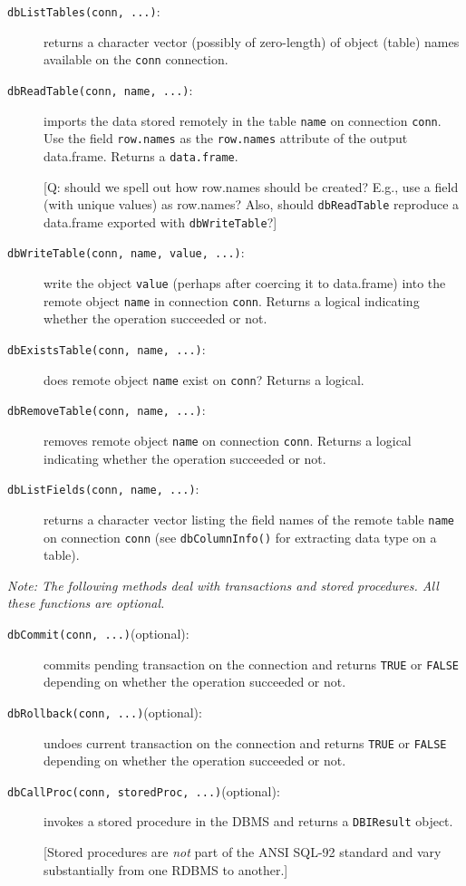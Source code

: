 \documentclass{article}
\newcommand{\sobj}[1]{\mbox{\tt #1}}    %
\newcommand{\sexp}[1]{\mbox{\tt #1}}    %
\newcommand{\sclass}[1]{\mbox{\tt #1}}  %
\newcommand{\smethod}[1]{\mbox{\tt #1}} %
\begin{document}
\begin{description}
\item[\smethod{dbListTables(conn, ...)}:]
  returns a character vector (possibly of zero-length) of object (table) 
  names available on the \sobj{conn} connection.

\item[\smethod{dbReadTable(conn, name, ...)}:]
  imports the data stored remotely in the table \sobj{name}
  on connection \sobj{conn}. Use the field \sobj{row.names} 
  as the \sexp{row.names} attribute of the output data.frame.
  Returns a \sclass{data.frame}.

  [Q: should we spell out how row.names should be created? E.g.,
  use a field (with unique values) as row.names?  Also, should
  \smethod{dbReadTable} reproduce a data.frame exported with
  \smethod{dbWriteTable}?]

\item[\smethod{dbWriteTable(conn, name, value, ...)}:]
  write the object \sobj{value} (perhaps after coercing it to 
  data.frame) into the remote object \sobj{name} in connection
  \sobj{conn}.  Returns a logical indicating whether the operation
  succeeded or not.

\item[\smethod{dbExistsTable(conn, name, ...)}:]
  does remote object \sobj{name} exist on \sobj{conn}?
  Returns a logical.

\item[\smethod{dbRemoveTable(conn, name, ...)}:]
  removes remote object \sobj{name} on connection \sobj{conn}.
  Returns a logical indicating whether the operation succeeded or not.

\item[\smethod{dbListFields(conn, name, ...)}:] returns a character vector
listing the field names of the remote table \sobj{name} on connection
\sobj{conn} (see \smethod{dbColumnInfo()} for extracting data type 
on a table).

\end{description}

\emph{Note: The following methods deal with transactions and 
   stored procedures. All these functions are optional.
}
\begin{description}
\item[\smethod{dbCommit(conn, ...)}(optional):]
  commits pending transaction on the connection and returns 
  \sobj{TRUE} or \sobj{FALSE} depending on whether the operation
  succeeded or not.

\item[\smethod{dbRollback(conn, ...)}(optional):]
  undoes current transaction on the connection and returns
  \sobj{TRUE} or \sobj{FALSE} depending on whether the operation
  succeeded or not.

\item[\smethod{dbCallProc(conn, storedProc, ...)}(optional):]
  invokes a stored procedure in the DBMS and returns a \sclass{DBIResult} 
  object.

  [Stored procedures are \emph{not} part of the ANSI SQL-92 standard and
  vary substantially from one RDBMS to another.]

\end{description}
\end{document}
